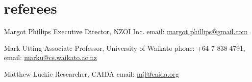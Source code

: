 \documentclass[]{friggeri-cv}
\begin{document}
\section{referees}

  {Margot Phillips}
  {Executive Director, NZOI Inc.}
  {email: \href{mailto:margot.phillips@gmail.com}{margot.phillips@gmail.com}}

  {Mark Utting}
  {Associate Professor, University of Waikato}
  {phone: +64 7 838 4791,
  email: \href{mailto:marku@cs.waikato.ac.nz}{marku@cs.waikato.ac.nz}}

  {Matthew Luckie}
  {Researcher, CAIDA}
  {email: \href{mailto:mjl@caida.org}{mjl@caida.org}}
\end{document}
